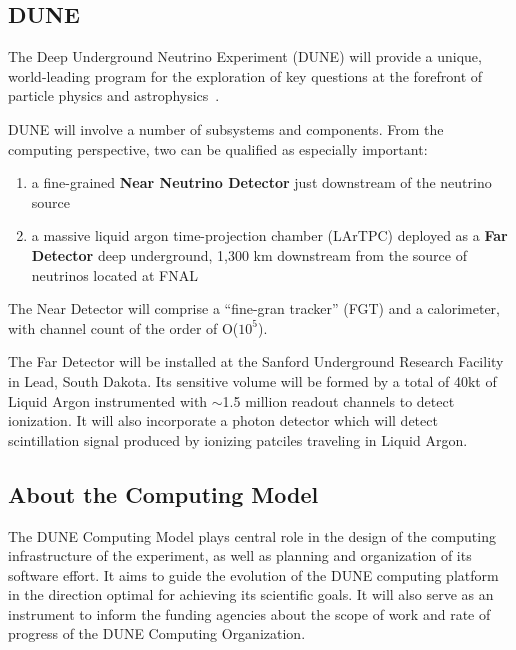 \subsection{DUNE}

The Deep Underground Neutrino Experiment (DUNE) will provide a unique, world-leading program
for the exploration of key questions at the forefront of particle physics and astrophysics~\cite{sciopps}.

DUNE will involve a number of subsystems and components. From the computing
perspective, two can be qualified as especially important:

\begin{enumerate}

\item a fine-grained \textbf{Near Neutrino Detector} just downstream of the neutrino source
\item a massive liquid argon time-projection chamber (LArTPC) deployed as a \textbf{Far
Detector} deep underground, 1,300 km downstream from the source of neutrinos located at FNAL

\end{enumerate}

The Near Detector will comprise a ``fine-gran tracker'' (FGT) and a calorimeter, with channel count of the order of O($10^{5}$).

The Far Detector will be installed at the Sanford Underground Research Facility in Lead, South Dakota.
Its sensitive volume will be formed by a total of 40kt of Liquid Argon instrumented with $\sim$1.5 million readout
channels to detect ionization. It will also incorporate a photon detector which will detect scintillation
signal produced by ionizing patciles traveling in Liquid Argon.



\subsection{About the Computing Model}
\label{sec:modelrole}

The DUNE Computing Model plays central role in the design of the computing infrastructure of the experiment, as well as
planning and organization of its software effort. It aims to guide the evolution of the DUNE computing platform in the direction
optimal for achieving its scientific goals. It will also serve
as an instrument to inform the funding agencies about the scope of work and rate of progress of the DUNE  
Computing Organization.

